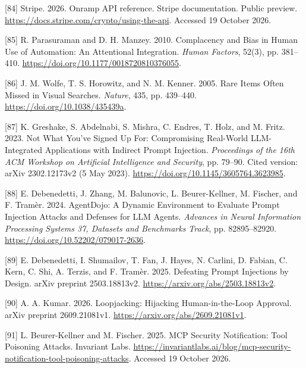 \documentclass[
  11pt,
]{article}
\newlength{\cslhangindent}
\newlength{\cslentryspacingunit} %
\newenvironment{CSLReferences}[2] %
 {%
  \setlength{\parindent}{0pt}
  \ifodd #1
  \let\oldpar\par
  \def\par{\hangindent=\cslhangindent\oldpar}
  \fi
  \setlength{\parskip}{#2\cslentryspacingunit}
 }%
 {}
\begin{document}
\begin{CSLReferences}{1}{1}
\leavevmode{}%
{[}84{]} Stripe. 2026. Onramp API reference. Stripe documentation.
Public preview. \url{https://docs.stripe.com/crypto/using-the-api}.
Accessed 19 October 2026.

\leavevmode{}%
{[}85{]} R. Parasuraman and D. H. Manzey. 2010. Complacency and Bias in
Human Use of Automation: An Attentional Integration. \emph{Human
Factors}, 52(3), pp. 381--410.
\url{https://doi.org/10.1177/0018720810376055}.

\leavevmode{}%
{[}86{]} J. M. Wolfe, T. S. Horowitz, and N. M. Kenner. 2005. Rare Items
Often Missed in Visual Searches. \emph{Nature}, 435, pp. 439--440.
\url{https://doi.org/10.1038/435439a}.

\leavevmode{}%
{[}87{]} K. Greshake, S. Abdelnabi, S. Mishra, C. Endres, T. Holz, and
M. Fritz. 2023. Not What You've Signed Up For: Compromising Real-World
LLM-Integrated Applications with Indirect Prompt Injection.
\emph{Proceedings of the 16th ACM Workshop on Artificial Intelligence
and Security}, pp. 79--90. Cited version: arXiv 2302.12173v2 (5 May
2023). \url{https://doi.org/10.1145/3605764.3623985}.

\leavevmode{}%
{[}88{]} E. Debenedetti, J. Zhang, M. Balunovic, L. Beurer-Kellner, M.
Fischer, and F. Tramèr. 2024. AgentDojo: A Dynamic Environment to
Evaluate Prompt Injection Attacks and Defenses for LLM Agents.
\emph{Advances in Neural Information Processing Systems 37, Datasets and
Benchmarks Track}, pp. 82895--82920.
\url{https://doi.org/10.52202/079017-2636}.

\leavevmode{}%
{[}89{]} E. Debenedetti, I. Shumailov, T. Fan, J. Hayes, N. Carlini, D.
Fabian, C. Kern, C. Shi, A. Terzis, and F. Tramèr. 2025. Defeating
Prompt Injections by Design. arXiv preprint 2503.18813v2.
\url{https://arxiv.org/abs/2503.18813v2}.

\leavevmode{}%
{[}90{]} A. A. Kumar. 2026. Loopjacking: Hijacking Human-in-the-Loop
Approval. arXiv preprint 2609.21081v1.
\url{https://arxiv.org/abs/2609.21081v1}.

\leavevmode{}%
{[}91{]} L. Beurer-Kellner and M. Fischer. 2025. MCP Security
Notification: Tool Poisoning Attacks. Invariant Labs.
\url{https://invariantlabs.ai/blog/mcp-security-notification-tool-poisoning-attacks}.
Accessed 19 October 2026.


\end{CSLReferences}
\end{document}

